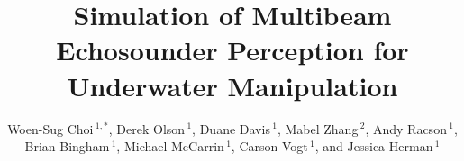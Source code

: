 \documentclass[utf8]{frontiersSCNS} %
\def\firstAuthorLast{Sample {et~al.}} %
\def\Authors{Woen-Sug Choi\,$^{1,*}$, Derek Olson\,$^{1}$, Duane Davis\,$^{1}$, Mabel Zhang\,$^{2}$, Andy Racson\,$^{1}$, Brian Bingham\,$^{1}$, Michael McCarrin\,$^{1}$, Carson Vogt\,$^{1}$, and Jessica Herman\,$^{1}$}
\begin{document}

\title[Running Title]{Simulation of Multibeam Echosounder Perception for Underwater Manipulation} 

\author[\firstAuthorLast ]{\Authors} %
\address{} %
\correspondance{} %

\extraAuth{}%

\maketitle
\end{document}
